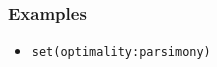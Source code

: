 \documentclass[11pt]{article}
\begin{document}
		\subsubsection{Examples}
			\begin{itemize}
					\item{\texttt{set(optimality:parsimony)}}
			\end{itemize}
%		
\end{document}
